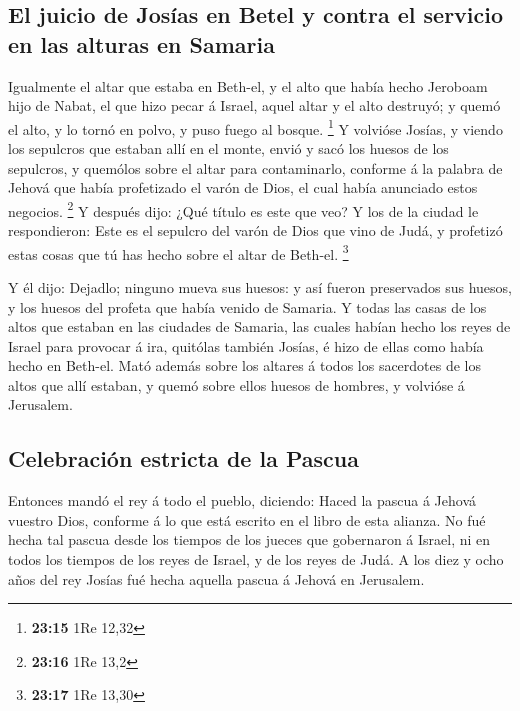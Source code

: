 \hypertarget{el-juicio-de-josuxedas-en-betel-y-contra-el-servicio-en-las-alturas-en-samaria}{%
\subsection{El juicio de Josías en Betel y contra el servicio en las
alturas en
Samaria}\label{el-juicio-de-josuxedas-en-betel-y-contra-el-servicio-en-las-alturas-en-samaria}}

 Igualmente el altar que estaba en Beth-el, y el alto que
había hecho Jeroboam hijo de Nabat, el que hizo pecar á Israel, aquel
altar y el alto destruyó; y quemó el alto, y lo tornó en polvo, y puso
fuego al bosque. \footnote{\textbf{23:15} 1Re 12,32}  Y
volvióse Josías, y viendo los sepulcros que estaban allí en el monte,
envió y sacó los huesos de los sepulcros, y quemólos sobre el altar para
contaminarlo, conforme á la palabra de Jehová que había profetizado el
varón de Dios, el cual había anunciado estos negocios. \footnote{\textbf{23:16}
  1Re 13,2}  Y después dijo: ¿Qué título es este que veo? Y
los de la ciudad le respondieron: Este es el sepulcro del varón de Dios
que vino de Judá, y profetizó estas cosas que tú has hecho sobre el
altar de Beth-el. \footnote{\textbf{23:17} 1Re 13,30}

 Y él dijo: Dejadlo; ninguno mueva sus huesos: y así fueron
preservados sus huesos, y los huesos del profeta que había venido de
Samaria.  Y todas las casas de los altos que estaban en las
ciudades de Samaria, las cuales habían hecho los reyes de Israel para
provocar á ira, quitólas también Josías, é hizo de ellas como había
hecho en Beth-el.  Mató además sobre los altares á todos
los sacerdotes de los altos que allí estaban, y quemó sobre ellos huesos
de hombres, y volvióse á Jerusalem.

\hypertarget{celebraciuxf3n-estricta-de-la-pascua}{%
\subsection{Celebración estricta de la
Pascua}\label{celebraciuxf3n-estricta-de-la-pascua}}

 Entonces mandó el rey á todo el pueblo, diciendo: Haced la
pascua á Jehová vuestro Dios, conforme á lo que está escrito en el libro
de esta alianza.  No fué hecha tal pascua desde los tiempos
de los jueces que gobernaron á Israel, ni en todos los tiempos de los
reyes de Israel, y de los reyes de Judá.  A los diez y ocho
años del rey Josías fué hecha aquella pascua á Jehová en Jerusalem.

